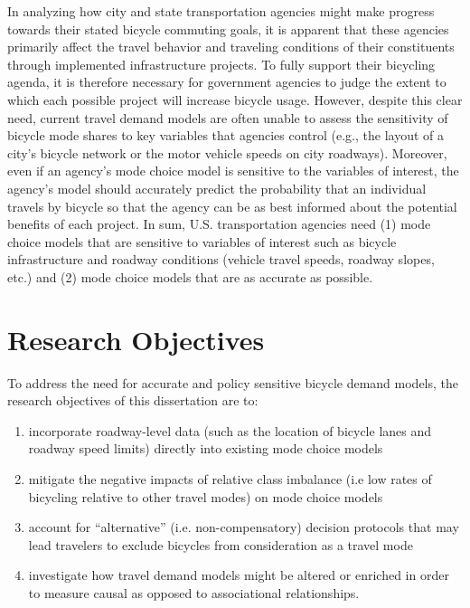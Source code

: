 \documentclass{article}
\begin{document}
In analyzing how city and state transportation agencies might make progress towards their stated bicycle commuting goals, it is apparent that these agencies primarily affect the travel behavior and traveling conditions of their constituents through implemented infrastructure projects. To fully support their bicycling agenda, it is therefore necessary for government agencies to judge the extent to which each possible project will increase bicycle usage. However, despite this clear need, current travel demand models are often unable to assess the sensitivity of bicycle mode shares to key variables that agencies control (e.g., the layout of a city's bicycle network or the motor vehicle speeds on city roadways). Moreover, even if an agency's mode choice model is sensitive to the variables of interest, the agency's model should accurately predict the probability that an individual travels by bicycle so that the agency can be as best informed about the potential benefits of each project. In sum, U.S. transportation agencies need (1) mode choice models that are sensitive to variables of interest such as bicycle infrastructure and roadway conditions (vehicle travel speeds, roadway slopes, etc.) and (2) mode choice models that are as accurate as possible.

\section{Research Objectives}
\label{sec:research-objectives}
To address the need for accurate and policy sensitive bicycle demand models, the research objectives of this dissertation are to:

\begin{enumerate}
\item incorporate roadway-level data (such as the location of bicycle lanes and roadway speed limits) directly into existing mode choice models

\item mitigate the negative impacts of relative class imbalance (i.e low rates of bicycling relative to other travel modes) on mode choice models
\label{class_imbal_goal}

\item account for ``alternative'' (i.e. non-compensatory) decision protocols that may lead travelers to exclude bicycles from consideration as a travel mode

\item investigate how travel demand models might be altered or enriched in order to measure causal as opposed to associational relationships.
\end{enumerate}
\end{document}
